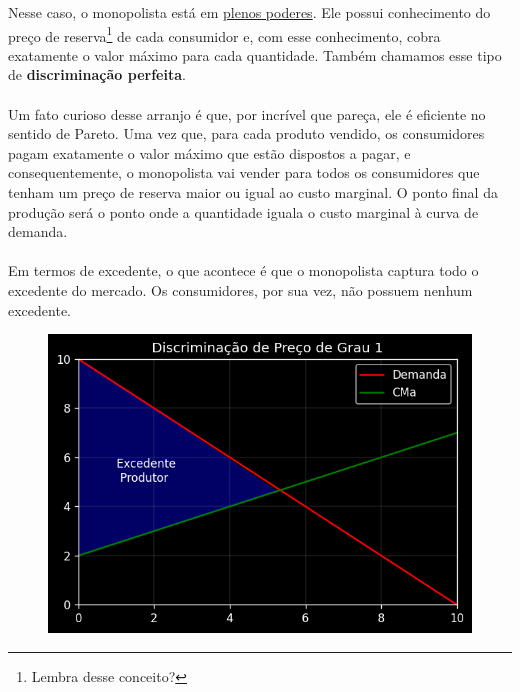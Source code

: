\documentclass[a4paper,11pt,oneside]{book}
\theoremstyle{definition}
\theoremstyle{break}
\begin{document}
Nesse caso, o monopolista está em \href{https://www.encurtador.com.br/eqCN1}{plenos poderes}. Ele possui conhecimento do preço de reserva\footnote{Lembra desse conceito?} de cada consumidor e, com esse conhecimento, cobra exatamente o valor máximo para cada quantidade. Também chamamos esse tipo de \textbf{discriminação perfeita}.
\\
\\
Um fato curioso desse arranjo é que, por incrível que pareça, ele é eficiente no sentido de Pareto. Uma vez que, para cada produto vendido, os consumidores pagam exatamente o valor máximo que estão dispostos a pagar, e consequentemente, o monopolista vai vender para todos os consumidores que tenham um preço de reserva maior ou igual ao custo marginal. O ponto final da produção será o ponto onde a quantidade iguala o custo marginal à curva de demanda.
\\
\\
Em termos de excedente, o que acontece é que o monopolista captura todo o excedente do mercado. Os consumidores, por sua vez, não possuem nenhum excedente.

\begin{figure}[H]
\centering
\includegraphics[scale=0.6]{cap26_2-discriminacao_grau1.png}
\end{figure}
\end{document}
